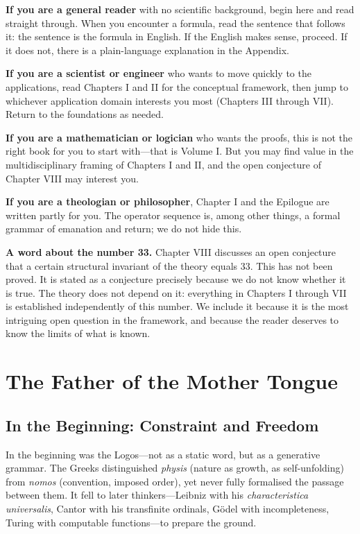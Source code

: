 \documentclass[12pt, oneside]{book}
\theoremstyle{plain}
\theoremstyle{definition}
\theoremstyle{remark}
\begin{document}
\textbf{If you are a general reader} with no scientific background,
begin here and read straight through. When you encounter a formula,
read the sentence that follows it: the sentence is the formula in
English. If the English makes sense, proceed. If it does not, there
is a plain-language explanation in the Appendix.

\textbf{If you are a scientist or engineer} who wants to move
quickly to the applications, read Chapters I and II for the
conceptual framework, then jump to whichever application domain
interests you most (Chapters III through VII). Return to the
foundations as needed.

\textbf{If you are a mathematician or logician} who wants the
proofs, this is not the right book for you to start with---that
is Volume I. But you may find value in the multidisciplinary
framing of Chapters I and II, and the open conjecture of
Chapter VIII may interest you.

\textbf{If you are a theologian or philosopher}, Chapter I and
the Epilogue are written partly for you. The operator sequence
is, among other things, a formal grammar of emanation and return;
we do not hide this.

\textbf{A word about the number 33.} Chapter VIII discusses an
open conjecture that a certain structural invariant of the theory
equals 33. This has not been proved. It is stated as a conjecture
precisely because we do not know whether it is true. The theory
does not depend on it: everything in Chapters I through VII is
established independently of this number. We include it because
it is the most intriguing open question in the framework, and
because the reader deserves to know the limits of what is known.

\mainmatter

\chapter{The Father of the Mother Tongue}
\label{ch:father}

\section{In the Beginning: Constraint and Freedom}

In the beginning was the Logos---not as a static word, but as a
generative grammar. The Greeks distinguished \emph{physis} (nature
as growth, as self-unfolding) from \emph{nomos} (convention, imposed
order), yet never fully formalised the passage between them. It fell
to later thinkers---Leibniz with his \emph{characteristica universalis},
Cantor with his transfinite ordinals, Gödel with incompleteness,
Turing with computable functions---to prepare the ground.
\end{document}
